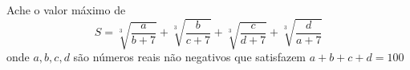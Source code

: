 Ache o valor máximo de
\[S = \sqrt[3]{\frac{a}{b+7}} + \sqrt[3]{\frac{b}{c+7}} + \sqrt[3]{\frac{c}{d+7}} + \sqrt[3]{\frac{d}{a+7}}\]
onde $a, b, c, d$ são números reais não negativos que satisfazem $a + b + c + d = 100$
